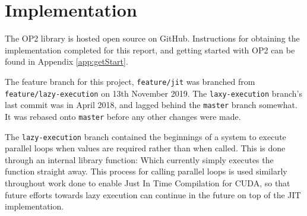 
\section{Implementation}
The OP2 library is hosted open source on GitHub\cite{OP2rep}. Instructions for obtaining the implementation completed for this report, and getting started with OP2 can be found in Appendix \ref{app:getStart}.
\par
The feature branch for this project, \verb|feature/jit| was branched from \\\verb|feature/lazy-execution| on 13th November 2019. The \verb|laxy-execution| branch's last commit was in April 2018, and lagged behind the \verb|master| branch somewhat. It was rebased onto \verb|master| before any other changes were made.
\par
The \verb|lazy-execution| branch contained the beginnings of a system to execute parallel loops when values are required rather than when called. This is done through an internal library function:
Which currently simply executes the function straight away. This process for calling parallel loops is used similarly throughout work done to enable Just In Time Compilation for CUDA, so that future efforts towards lazy execution can continue in the future on top of the JIT implementation.

